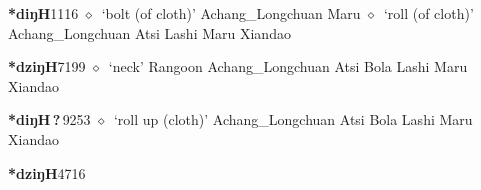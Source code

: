   \begin{list}{}{\leftmargin=1.5em \itemindent=-1.5em}
  \item {\footnotesize \textbf{*diŋH}}{\tiny 1116}
         $\diamond$~`bolt (of cloth)'
         Achang\_Longchuan 
\hspace{1ex}
         Maru 
\hspace{1ex}
         $\diamond$~`roll (of cloth)'
         Achang\_Longchuan 
\hspace{1ex}
         Atsi 
\hspace{1ex}
         Lashi 
\hspace{1ex}
         Maru 
\hspace{1ex}
         Xiandao 
  \item {\footnotesize \textbf{*dziŋH}}{\tiny 7199}
\hspace{1ex}
         $\diamond$~`neck'
         Rangoon 
\hspace{1ex}
         Achang\_Longchuan 
\hspace{1ex}
         Atsi 
\hspace{1ex}
         Bola 
\hspace{1ex}
         Lashi 
\hspace{1ex}
         Maru 
\hspace{1ex}
         Xiandao 
  \item {\footnotesize \textbf{*diŋH\,?\,}}{\tiny 9253}
\hspace{1ex}
         $\diamond$~`roll up (cloth)'
         Achang\_Longchuan 
\hspace{1ex}
         Atsi 
\hspace{1ex}
         Bola 
\hspace{1ex}
         Lashi 
\hspace{1ex}
         Maru 
\hspace{1ex}
         Xiandao 
  \item {\footnotesize \textbf{*dziŋH}}{\tiny 4716}

\end{list}
